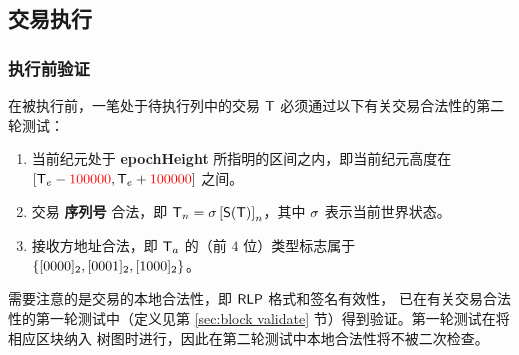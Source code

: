 \subsection{交易执行}

\subsubsection{执行前验证}
\label{sec:tx validate}

在被执行前，一笔处于待执行列中的交易 $\textsf{T}$ 必须通过以下有关交易合法性的第二轮测试：
\begin{enumerate}[nosep]
	\item 当前纪元处于 \textbf{epochHeight} 所指明的区间之内，即当前纪元高度在 $[\textsf{T}_e - {\color{red}100000}, \textsf{T}_e + {\color{red}100000}]$ 之间。
	
	\item 交易 \textbf{序列号} 合法，即 $\textsf{T}_n = \mathbf{\sigma}\left[\mathsf{S}{\left({\textsf{T}} \right)}\right]_n$，其中 $\mathbf{\sigma}$ 表示当前世界状态。

	\item 接收方地址合法，即 $\textsf{T}_a$ 的（前 $4$ 位）类型标志属于 ${\left \{{[0000]_2,[0001]_2,[1000]_2} \right \}}$。
\end{enumerate}

需要注意的是交易的本地合法性，即 $\mathsf{RLP}$ 格式和签名有效性，
已在有关交易合法性的第一轮测试中（定义见第 \ref{sec:block validate} 节）得到验证。第一轮测试在将相应区块纳入 \name 树图时进行，因此在第二轮测试中本地合法性将不被二次检查。

